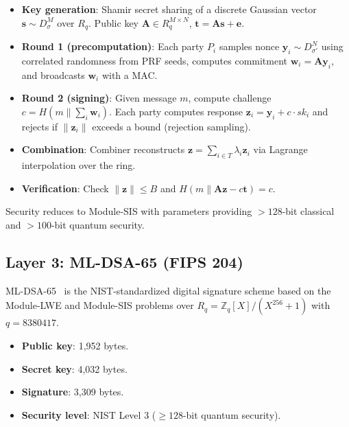 \documentclass[11pt,a4paper]{article}
\begin{document}
\begin{itemize}[leftmargin=2em]
\item \textbf{Key generation}: Shamir secret sharing of a discrete Gaussian
      vector $\mathbf{s} \sim D_{\sigma}^{M}$ over $R_q$. Public key
      $\mathbf{A} \in R_q^{M \times N}$, $\mathbf{t} = \mathbf{A}\mathbf{s}
      + \mathbf{e}$.
\item \textbf{Round 1 (precomputation)}: Each party $P_i$ samples nonce
      $\mathbf{y}_i \sim D_{\sigma'}^N$ using correlated randomness from PRF
      seeds, computes commitment $\mathbf{w}_i = \mathbf{A}\mathbf{y}_i$, and
      broadcasts $\mathbf{w}_i$ with a MAC.
\item \textbf{Round 2 (signing)}: Given message $m$, compute challenge
      $c = H(m \mathbin\| \sum_i \mathbf{w}_i)$. Each party computes response
      $\mathbf{z}_i = \mathbf{y}_i + c \cdot \mathit{sk}_i$ and rejects if
      $\|\mathbf{z}_i\|$ exceeds a bound (rejection sampling).
\item \textbf{Combination}: Combiner reconstructs $\mathbf{z} = \sum_{i \in T}
      \lambda_i \mathbf{z}_i$ via Lagrange interpolation over the ring.
\item \textbf{Verification}: Check $\|\mathbf{z}\| \leq B$ and
      $H(m \mathbin\| \mathbf{A}\mathbf{z} - c\mathbf{t}) = c$.
\end{itemize}

Security reduces to Module-SIS with parameters providing $> 128$-bit classical
and $> 100$-bit quantum security.

\subsection{Layer 3: ML-DSA-65 (FIPS 204)}

ML-DSA-65~\cite{nist-pqc} is the NIST-standardized digital signature scheme
based on the Module-LWE and Module-SIS problems over
$R_q = \mathbb{Z}_q[X]/(X^{256}+1)$ with $q = 8380417$.

\begin{itemize}[leftmargin=2em]
\item \textbf{Public key}: 1{,}952 bytes.
\item \textbf{Secret key}: 4{,}032 bytes.
\item \textbf{Signature}: 3{,}309 bytes.
\item \textbf{Security level}: NIST Level 3 ($\geq 128$-bit quantum security).
\end{itemize}
\end{document}
